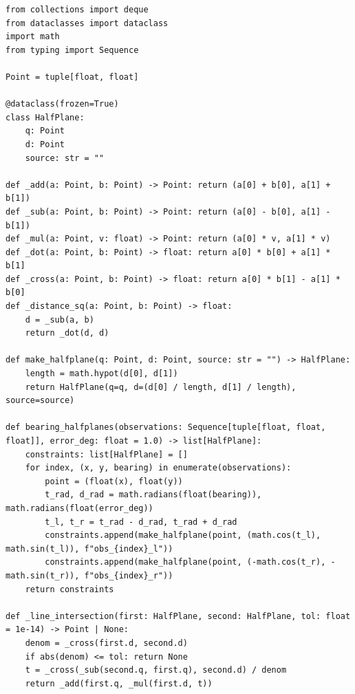 \begin{lstlisting}[caption={问题一核心算法（q1\_geometry.py）}]
from collections import deque
from dataclasses import dataclass
import math
from typing import Sequence

Point = tuple[float, float]

@dataclass(frozen=True)
class HalfPlane:
    q: Point
    d: Point
    source: str = ""

def _add(a: Point, b: Point) -> Point: return (a[0] + b[0], a[1] + b[1])
def _sub(a: Point, b: Point) -> Point: return (a[0] - b[0], a[1] - b[1])
def _mul(a: Point, v: float) -> Point: return (a[0] * v, a[1] * v)
def _dot(a: Point, b: Point) -> float: return a[0] * b[0] + a[1] * b[1]
def _cross(a: Point, b: Point) -> float: return a[0] * b[1] - a[1] * b[0]
def _distance_sq(a: Point, b: Point) -> float: 
    d = _sub(a, b)
    return _dot(d, d)

def make_halfplane(q: Point, d: Point, source: str = "") -> HalfPlane:
    length = math.hypot(d[0], d[1])
    return HalfPlane(q=q, d=(d[0] / length, d[1] / length), source=source)

def bearing_halfplanes(observations: Sequence[tuple[float, float, float]], error_deg: float = 1.0) -> list[HalfPlane]:
    constraints: list[HalfPlane] = []
    for index, (x, y, bearing) in enumerate(observations):
        point = (float(x), float(y))
        t_rad, d_rad = math.radians(float(bearing)), math.radians(float(error_deg))
        t_l, t_r = t_rad - d_rad, t_rad + d_rad
        constraints.append(make_halfplane(point, (math.cos(t_l), math.sin(t_l)), f"obs_{index}_l"))
        constraints.append(make_halfplane(point, (-math.cos(t_r), -math.sin(t_r)), f"obs_{index}_r"))
    return constraints

def _line_intersection(first: HalfPlane, second: HalfPlane, tol: float = 1e-14) -> Point | None:
    denom = _cross(first.d, second.d)
    if abs(denom) <= tol: return None
    t = _cross(_sub(second.q, first.q), second.d) / denom
    return _add(first.q, _mul(first.d, t))


\end{lstlisting}
